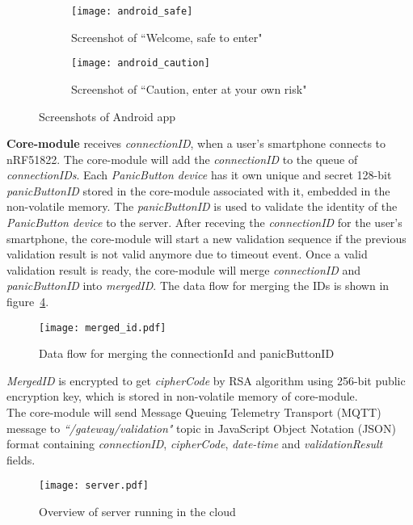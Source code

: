 \begin{figure}[H]
\begin{subfigure}{.5\textwidth}
  \centering
  \texttt{[image: android\_safe]}
  \caption{Screenshot of ``Welcome, safe to enter"}
  \label{fig:android_safe}
\end{subfigure}%
\begin{subfigure}{.5\textwidth}
  \centering
  \texttt{[image: android\_caution]}
  \caption{Screenshot of ``Caution, enter at your own risk"}
  \label{fig:android_caution}
\end{subfigure}
\caption{Screenshots of Android app}
\label{fig:android_screenshot}
\end{figure}



\textbf{Core-module} receives \emph{connectionID}, when a user's smartphone connects to nRF51822. The core-module will add the \emph{connectionID} to the queue of \emph{connectionIDs}. Each \emph{PanicButton device} has it own unique and secret 128-bit  \emph{panicButtonID} stored in the core-module associated with it, embedded in the non-volatile memory. The \emph{panicButtonID} is used to validate the identity of the \emph{PanicButton device} to the server.
After receving the \emph{connectionID} for the user's smartphone, the core-module will start a new validation sequence if the previous validation result is not valid anymore due to timeout event. Once a valid validation result is ready, the core-module will merge \emph{connectionID} and \emph{panicButtonID} into \emph{mergedID}. The data flow for merging the IDs is shown in figure~\ref{fig:merged_id}.
\begin{figure}[H]
\centering
\texttt{[image: merged\_id.pdf]}
\caption{Data flow for merging the connectionId and panicButtonID}
\label{fig:merged_id}
\end{figure}
\emph{MergedID} is encrypted to get \emph{cipherCode} by RSA algorithm using 256-bit public encryption key, which is stored in non-volatile memory of core-module.\\
The core-module will send Message Queuing Telemetry Transport (MQTT) message to \emph{``/gateway/validation"} topic in JavaScript Object Notation (JSON) format containing \emph{connectionID}, \emph{cipherCode}, \emph{date-time} and \emph{validationResult} fields.

\begin{figure}[H]
\centering
\texttt{[image: server.pdf]}
\caption{Overview of server running in the cloud}
\label{fig:server}
\end{figure}

